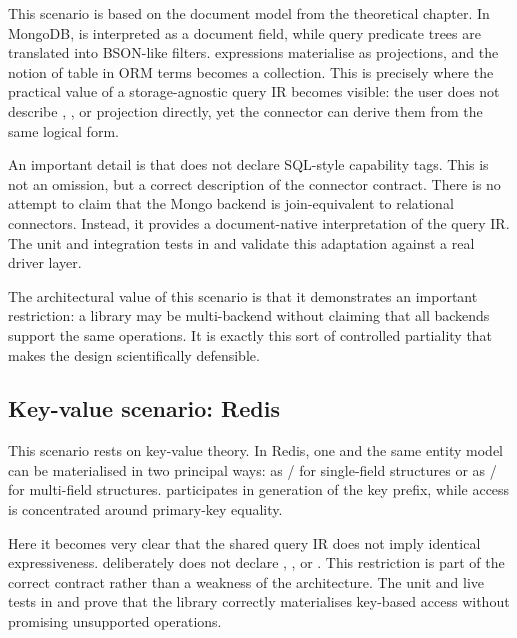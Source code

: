 This scenario is based on the document model from the theoretical chapter. In MongoDB,  is interpreted as a document field, while query predicate trees are translated into BSON-like filters.  expressions materialise as projections, and the notion of table in ORM terms becomes a collection. This is precisely where the practical value of a storage-agnostic query IR becomes visible: the user does not describe , , or projection directly, yet the connector can derive them from the same logical form.

An important detail is that  does not declare SQL-style capability tags. This is not an omission, but a correct description of the connector contract. There is no attempt to claim that the Mongo backend is join-equivalent to relational connectors. Instead, it provides a document-native interpretation of the query IR. The unit and integration tests in  and  validate this adaptation against a real driver layer.

The architectural value of this scenario is that it demonstrates an important restriction: a library may be multi-backend without claiming that all backends support the same operations. It is exactly this sort of controlled partiality that makes the design scientifically defensible.

\subsection{Key-value scenario: Redis}

This scenario rests on key-value theory. In Redis, one and the same entity model can be materialised in two principal ways: as / for single-field structures or as / for multi-field structures.  participates in generation of the key prefix, while access is concentrated around primary-key equality.

Here it becomes very clear that the shared query IR does not imply identical expressiveness.  deliberately does not declare , , or . This restriction is part of the correct contract rather than a weakness of the architecture. The unit and live tests in  and  prove that the library correctly materialises key-based access without promising unsupported operations.

